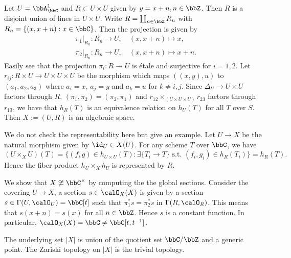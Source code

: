     \begin{example}\label{eg:C/Z_as_algebraic_space}
        Let \(U = \bbA_\bbC^1\) and \(R \subset U \times U\) given by \(y=x+n, n \in \bbZ\).
        Then \(R\) is a disjoint union of lines in \(U \times U\).
        Write \(R = \coprod_{n\in \bbZ} R_n\) with \(R_n = \{(x,x+n): x \in \bbC\}\).
        Then the projection is given by 
        \begin{align*}
            &\pi_1|_{R_n}:R_n \to U, \quad (x,x+n) \mapsto x, \\
            &\pi_2|_{R_n}:R_n \to U, \quad (x,x+n) \mapsto x+n.
        \end{align*} 
        Easily see that the projection \(\pi_i: R \to U\) is \'etale and surjective for \(i=1,2\).
        Let \(r_{ij}:R \times U \to U \times U \times U\) be the morphism which maps \(((x,y),u)\) to \((a_1,a_2,a_3)\) where \(a_i = x\), \(a_j = y\) and \(a_k = u\) for \(k \neq i,j\).
        Since \(\Delta_U \to U\times U\) factors through \(R\), \((\pi_1,\pi_2) = (\pi_2,\pi_1)\) and 
        \(r_{12} \times_{(U\times U\times U)} r_{23}\) factors through \(r_{13}\), 
        we have that \(h_R(T)\) is an equivalence relation on \(h_U(T)\) for all \(T\) over \(S\).
        Then \(X := (U,R)\) is an algebraic space.
        
        We do not check the representability here but give an example.
        Let \(U \to X\) be the natural morphism given by \(\id_U \in X(U)\).
        For any scheme \(T\) over \(\bbC\), we have
        \[ (U\times_X U)(T) = \{(f,g) \in h_{U\times U}(T): \exists \{T_i \to T\} \text{ s.t. } (f_i,g_i) \in h_R(T_i) \} = h_R(T). \]
        Hence the fiber product \(h_U \times_X h_U\) is represented by \(R\).
        
        We show that \(X \not\cong \bbC^{\times}\) by computing the the global sections.
        Consider the covering \(U \to X\), a section \(s \in \calO_X(X)\) is given by a section \(s \in \Gamma(U,\calO_U) = \bbC[t]\) such that \(\pi_1^*s = \pi_2^*s\) in \(\Gamma(R,\calO_R)\).
        This means that \(s(x+n) = s(x)\) for all \(n \in \bbZ\).
        Hence \(s\) is a constant function.
        In particular, \(\calO_X(X) = \bbC \neq \bbC[t,t^{-1}]\).

        The underlying set \(|X|\) is union of the quotient set \(\bbC/\bbZ\) and a generic point.
        The Zariski topology on \(|X|\) is the trivial topology.
    \end{example}

